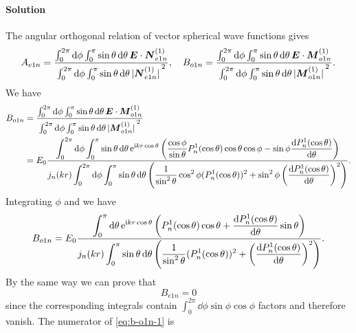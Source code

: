 \documentclass[hyperref, a4paper]{article}
\newcommand*{\ii}{\mathrm{i}}
\newcommand*{\ee}{\mathrm{e}}
\begin{document}
\paragraph{Solution} The angular orthogonal relation of vector spherical wave functions gives
\[
    A_{e1n} = \frac{\int_0^{2\pi} \dd{\phi} \int_0^\pi \sin \theta \dd{\theta} \vb*{E} \cdot \vb*{N}^{(1)}_{e1n}}{\int_0^{2\pi} \dd{\phi} \int_0^\pi \sin \theta \dd{\theta} \abs*{\vb*{N}_{e1n}^{(1)}}^2}, \quad B_{o1n} = \frac{\int_0^{2\pi} \dd{\phi} \int_0^\pi \sin \theta \dd{\theta} \vb*{E} \cdot \vb*{M}_{o1n}^{(1)}}{\int_0^{2\pi} \dd{\phi} \int_0^\pi \sin \theta \dd{\theta} \abs*{\vb*{M}^{(1)}_{o1n}}^2}.
\]
We have 
\[
    \begin{aligned}
        B_{o1n} &= \dfrac{\int_0^{2\pi} \dd{\phi} \int_0^\pi \sin \theta \dd{\theta} \vb*{E} \cdot \vb*{M}_{o1n}^{(1)}}{\int_0^{2\pi} \dd{\phi} \int_0^\pi \sin \theta \dd{\theta} \abs*{\vb*{M}^{(1)}_{o1n}}^2} \\
        &= E_0 \frac{\displaystyle \int_0^{2\pi} \dd{\phi} \int_0^\pi \sin \theta \dd{\theta} \ee^{\ii k r \cos \theta} \left( \frac{\cos\phi}{\sin\theta} P^1_n(\cos\theta) \cos\theta \cos\phi - \sin\phi \dv{P^1_n(\cos\theta)}{\theta} (-\sin\phi) \right)}{\displaystyle j_n(kr) \int_0^{2\pi} \dd{\phi} \int_0^\pi \sin \theta \dd{\theta} \left( \frac{1}{\sin^2 \theta} \cos^2\phi (P^1_n(\cos \theta))^2 + \sin^2\phi \left( \dv{P_n^1(\cos\theta)}{\theta} \right)^2 \right) }.
    \end{aligned}
\]
Integrating $\phi$ and we have 
\begin{equation}
    B_{o1n} = E_0 \frac{\displaystyle \int_0^\pi \dd{\theta} \ee^{\ii k r \cos \theta} \left( P^1_n(\cos\theta) \cos\theta + \dv{P^1_n(\cos\theta)}{\theta} \sin \theta \right)}{\displaystyle j_n(kr) \int_0^\pi \sin \theta \dd{\theta} \left( \frac{1}{\sin^2 \theta} (P^1_n(\cos \theta))^2 + \left( \dv{P_n^1(\cos\theta)}{\theta} \right)^2 \right) }.
    \label{eq:b-o1n-1}
\end{equation}
By the same way we can prove that 
\begin{equation}
    B_{e1n} = 0
    \label{eq:be1n-0}
\end{equation}
since the corresponding integrals contain $\int_0^{2\pi} \dd{\phi} \sin\phi \cos\phi$ factors and therefore vanish.
The numerator of \eqref{eq:b-o1n-1} is
\end{document}
